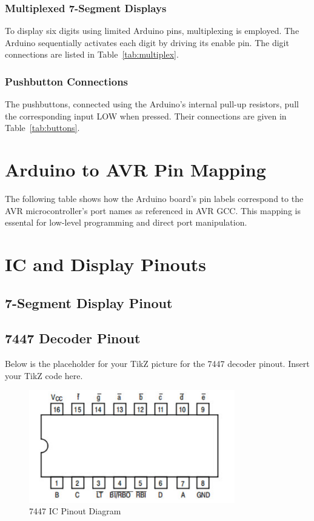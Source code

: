\documentclass[a4paper,12pt]{article}
\begin{document}
\subsubsection{Multiplexed 7-Segment Displays}
To display six digits using limited Arduino pins, multiplexing is employed. The Arduino sequentially activates each digit by driving its enable pin. The digit connections are listed in Table~\ref{tab:multiplex}.


\subsubsection{Pushbutton Connections}
The pushbuttons, connected using the Arduino's internal pull-up resistors, pull the corresponding input LOW when pressed. Their connections are given in Table~\ref{tab:buttons}.


\section{Arduino to AVR Pin Mapping}
The following table shows how the Arduino board’s pin labels correspond to the AVR microcontroller’s port names as referenced in AVR GCC. This mapping is essental for low-level programming and direct port manipulation.


\section{IC and Display Pinouts}
\subsection{7-Segment Display Pinout}
\begin{center}

\label{fig:7seg}
\end{center}

\subsection{7447 Decoder Pinout}
Below is the placeholder for your TikZ picture for the 7447 decoder pinout. Insert your TikZ code here.

\begin{figure}[h]
    \centering
    \includegraphics[width=0.8\textwidth]{figs/7447_pinout.png}
    \caption{7447 IC Pinout Diagram}
    \label{fig:7447_pinout}
\end{figure}
\end{document}
